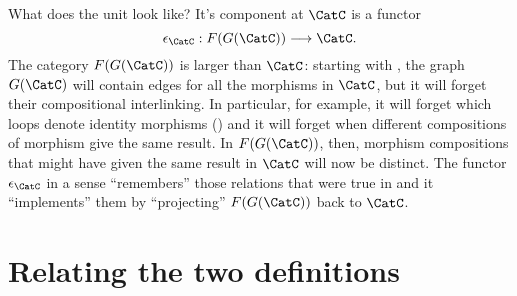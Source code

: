 What does the unit look like? It's component at $\CatC$ is a functor
$$
\epsilon_{\CatC} : F(G(\CatC)) \longrightarrow \CatC. 
$$
The category $F(G(\CatC))$ is larger than $\CatC$: starting with \CatC, the graph $G(\CatC)$ will contain edges for all the morphisms in $\CatC$, but it will forget their compositional interlinking. In particular, for example, it will forget which loops denote identity morphisms () and it will forget when different compositions of morphism give the same result. In $F(G(\CatC))$, then, morphism compositions that might have given the same result in $\CatC$ will now be distinct. 
The functor $\epsilon_{\CatC}$ in a sense ``remembers'' those relations that were true in \CatC and it ``implements'' them by ``projecting'' $F(G(\CatC))$ back to  $\CatC$. 
 



\section{Relating the two definitions}\label{relate-adj-defs}



